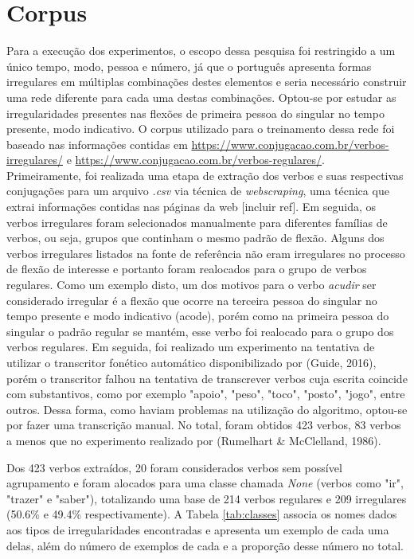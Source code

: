 \chapter{Corpus}
\label{ch:06}

Para a execução dos experimentos, o escopo dessa pesquisa foi restringido a um único tempo, modo, pessoa e número, já que o português apresenta formas irregulares em múltiplas combinações destes elementos e seria necessário construir uma rede diferente para cada uma destas combinações. Optou-se por estudar as irregularidades presentes nas flexões de primeira pessoa do singular no tempo presente, modo indicativo.  
O corpus utilizado para o treinamento dessa rede foi baseado nas informações contidas em \url{https://www.conjugacao.com.br/verbos-irregulares/} e \url{https://www.conjugacao.com.br/verbos-regulares/}.\\
Primeiramente, foi realizada uma etapa de extração dos verbos e suas respectivas conjugações para um arquivo \textit{.csv} via técnica de \textit{webscraping}, uma técnica que extrai informações contidas nas páginas da web [incluir ref]. Em seguida, os verbos irregulares foram selecionados manualmente para diferentes famílias de verbos, ou seja, grupos que continham o mesmo padrão de flexão. Alguns dos verbos irregulares listados na fonte de referência não eram irregulares no processo de flexão de interesse e portanto foram realocados para o grupo de verbos regulares. Como um exemplo disto, um dos motivos para o verbo \textit{acudir} ser considerado irregular é a flexão que ocorre na terceira pessoa do singular no tempo presente e modo indicativo (acode), porém como na primeira pessoa do singular o padrão regular se mantém, esse verbo foi realocado para o grupo dos verbos regulares. Em seguida, foi realizado um experimento na tentativa de utilizar o transcritor fonético automático disponibilizado por (Guide, 2016)\cite{guide:2016}, porém o transcritor falhou na tentativa de transcrever verbos cuja escrita coincide com substantivos, como por exemplo "apoio", "peso", "toco", "posto", "jogo", entre outros. Dessa forma, como haviam problemas na utilização do algoritmo, optou-se por fazer uma transcrição manual. No total, foram obtidos 423 verbos, 83 verbos a menos que no experimento realizado por (Rumelhart & McClelland, 1986)\cite{rumelhart:1986}.

Dos 423 verbos extraídos, 20 foram considerados verbos sem possível agrupamento e foram alocados para uma classe chamada \textit{None} (verbos como "ir", "trazer" e "saber"), totalizando uma base de 214 verbos regulares e 209 irregulares (50.6\% e 49.4\% respectivamente). A Tabela \ref{tab:classes} associa os nomes dados aos tipos de irregularidades encontradas e apresenta um exemplo de cada uma delas, além do número de exemplos de cada e a proporção desse número no total. 

